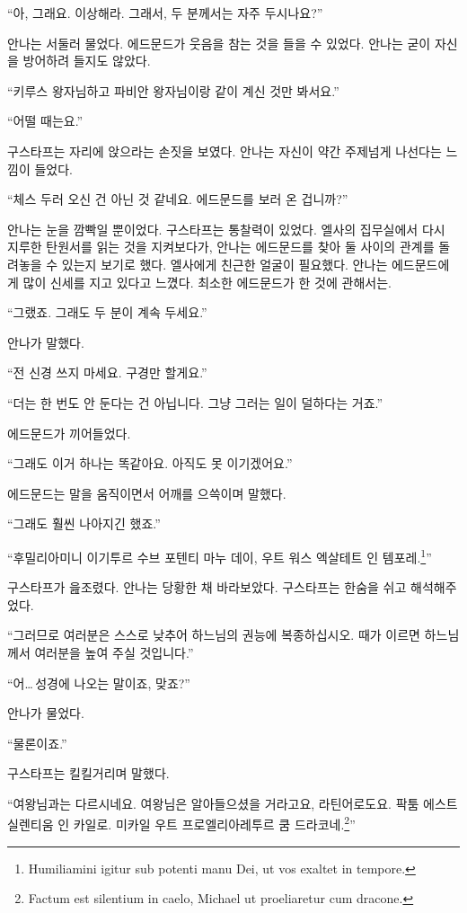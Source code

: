 ``아, 그래요. 이상해라. 그래서, 두 분께서는 자주 두시나요?''

안나는 서둘러 물었다. 에드문드가 웃음을 참는 것을 들을 수 있었다. 안나는 굳이 자신을 방어하려 들지도 않았다.

``키루스 왕자님하고 파비안 왕자님이랑 같이 계신 것만 봐서요.''

``어떨 때는요.''

구스타프는 자리에 앉으라는 손짓을 보였다. 안나는 자신이 약간 주제넘게 나선다는 느낌이 들었다.

``체스 두러 오신 건 아닌 것 같네요. 에드문드를 보러 온 겁니까?''

안나는 눈을 깜빡일 뿐이었다. 구스타프는 통찰력이 있었다. 엘사의 집무실에서 다시 지루한 탄원서를 읽는 것을 지켜보다가, 안나는 에드문드를 찾아 둘 사이의 관계를 돌려놓을 수 있는지 보기로 했다. 엘사에게 친근한 얼굴이 필요했다. 안나는 에드문드에게 많이 신세를 지고 있다고 느꼈다. 최소한 에드문드가 한 것에 관해서는.

``그랬죠. 그래도 두 분이 계속 두세요.''

안나가 말했다.

``전 신경 쓰지 마세요. 구경만 할게요.''

``더는 한 번도 안 둔다는 건 아닙니다. 그냥 그러는 일이 덜하다는 거죠.''

에드문드가 끼어들었다.

``그래도 이거 하나는 똑같아요. 아직도 못 이기겠어요.''

에드문드는 말을 움직이면서 어깨를 으쓱이며 말했다.

``그래도 훨씬 나아지긴 했죠.''

``후밀리아미니 이기투르 수브 포텐티 마누 데이, 우트 워스 엑살테트 인 템포레.\footnote{Humiliamini igitur sub potenti manu Dei, ut vos exaltet in tempore.}''

구스타프가 읊조렸다. 안나는 당황한 채 바라보았다. 구스타프는 한숨을 쉬고 해석해주었다.

``그러므로 여러분은 스스로 낮추어 하느님의 권능에 복종하십시오. 때가 이르면 하느님께서 여러분을 높여 주실 것입니다.''

``어\ldots\,성경에 나오는 말이죠, 맞죠?''

안나가 물었다.

``물론이죠.''

구스타프는 킬킬거리며 말했다.

``여왕님과는 다르시네요. 여왕님은 알아들으셨을 거라고요, 라틴어로도요. 팍툼 에스트 실렌티움 인 카일로. 미카일 우트 프로엘리아레투르 쿰 드라코네.\footnote{Factum est silentium in caelo, Michael ut proeliaretur cum dracone.}''

